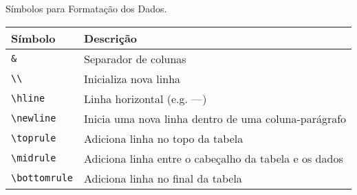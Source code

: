 \begin{quadro}[H]
    \centering
    \caption{Símbolos para Formatação dos Dados.\label{qua:quadro-dados}}
    \begin{tabular}{|p{4cm}|p{10cm}|}
        \hline
        \textbf{Símbolo} & \textbf{Descrição} \\
        \hline
        \verb|&| & Separador de colunas \\
        \hline
        \verb|\\| & Inicializa nova linha \\
        \hline
        \verb|\hline| & Linha horizontal (e.g. ---) \\
        \hline
        \verb|\newline| & Inicia uma nova linha dentro de uma coluna-parágrafo \\
        \hline
        \verb|\toprule| & Adiciona linha no topo da tabela \\
        \hline
        \verb|\midrule| & Adiciona linha entre o cabeçalho da tabela e os dados \\
        \hline
        \verb|\bottomrule| & Adiciona linha no final da tabela \\
        \hline
    \end{tabular}
\end{quadro}